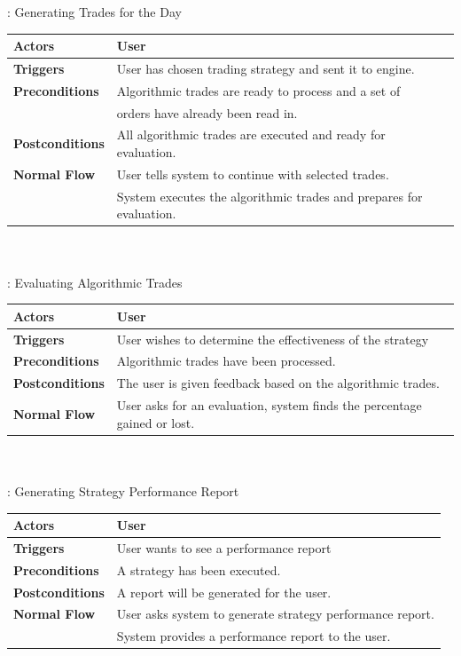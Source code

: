 \documentclass[a4paper]{article}
\begin{document}
: Generating Trades for the Day \\ 
\begin{tabular}{ | l | p{10cm} |}\hline
	{\bf Actors} & User \\\hline
	{\bf Triggers} & User has chosen trading strategy and sent it to engine. \\\hline
	{\bf Preconditions} & Algorithmic trades are ready to process and a set of \\
	& orders have already been read in. \\\hline
	{\bf Postconditions} & All algorithmic trades are executed and ready for evaluation. \\\hline
	{\bf Normal Flow} & User tells system to continue with selected trades. \\
	& System executes the algorithmic trades and prepares for evaluation. \\\hline
\end{tabular} \\\\

\newpage
{}: Evaluating Algorithmic Trades \\ 
\begin{tabular}{ | l | p{10cm} |}\hline
	{\bf Actors} & User \\\hline
	{\bf Triggers} & User wishes to determine the effectiveness of the strategy \\\hline
	{\bf Preconditions} & Algorithmic trades have been processed. \\\hline
	{\bf Postconditions} & The user is given feedback based on the algorithmic trades. \\\hline
	{\bf Normal Flow} & User asks for an evaluation, system finds the percentage gained or lost. \\\hline
\end{tabular} \\\\

: Generating Strategy Performance Report \\ 
\begin{tabular}{ | l | p{10cm} |}\hline
	{\bf Actors} & User \\\hline
	{\bf Triggers} & User wants to see a performance report \\\hline
	{\bf Preconditions} & A strategy has been executed. \\\hline
	{\bf Postconditions} & A report will be generated for the user. \\\hline
	{\bf Normal Flow} & User asks system to generate strategy performance report. \\
	& System provides a performance report to the user.\\\hline
\end{tabular} \\\\
\end{document}
